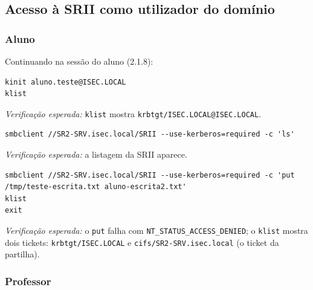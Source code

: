 
\subsection[Acesso à SRII como utilizador do domínio]{Acesso à SRII como utilizador do domínio}


\subsubsection[Aluno]{Aluno}


Continuando na sessão do aluno (2.1.8):

\begin{lstlisting}[style=bashstyle]
kinit aluno.teste@ISEC.LOCAL
klist
\end{lstlisting}

\emph{Verificação esperada:} \texttt{klist} mostra \texttt{krbtgt/\allowbreak{}ISEC.LOCAL@ISEC.LOCAL}.


\begin{lstlisting}[style=bashstyle]
smbclient //SR2-SRV.isec.local/SRII --use-kerberos=required -c 'ls'
\end{lstlisting}

\emph{Verificação esperada:} a listagem da SRII aparece.


\begin{lstlisting}[style=bashstyle]
smbclient //SR2-SRV.isec.local/SRII --use-kerberos=required -c 'put /tmp/teste-escrita.txt aluno-escrita2.txt'
klist
exit
\end{lstlisting}

\emph{Verificação esperada:} o \texttt{put} falha com \texttt{NT\_STATUS\_ACCESS\_DENIED}; o \texttt{klist} mostra dois tickets: \texttt{krbtgt/\allowbreak{}ISEC.LOCAL} e \texttt{cifs/\allowbreak{}SR2-SRV.isec.local} (o ticket da partilha).

\subsubsection[Professor]{Professor}


